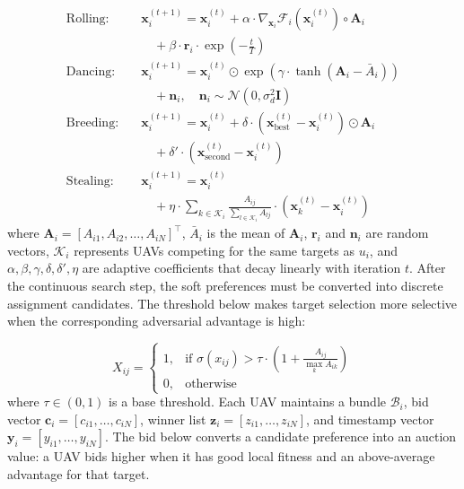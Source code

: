 \documentclass[lettersize,journal]{IEEEtran}
\begin{document}
\begin{align}
\text{Rolling:} \quad & \mathbf{x}_i^{(t+1)} = \mathbf{x}_i^{(t)} + \alpha \cdot \nabla_{\mathbf{x}_i} \mathcal{F}_i(\mathbf{x}_i^{(t)}) \circ \mathbf{A}_i \nonumber \\
& \quad + \beta \cdot \mathbf{r}_i \cdot \exp\left(-\frac{t}{T}\right) \label{eq:rolling_update} \\
\text{Dancing:} \quad & \mathbf{x}_i^{(t+1)} = \mathbf{x}_i^{(t)} \odot \exp\left(\gamma \cdot \tanh(\mathbf{A}_i - \bar{A}_i)\right) \nonumber \\
& \quad + \mathbf{n}_i, \quad \mathbf{n}_i \sim \mathcal{N}(0, \sigma_d^2 \mathbf{I}) \label{eq:dancing_update} \\
\text{Breeding:} \quad & \mathbf{x}_i^{(t+1)} = \mathbf{x}_i^{(t)} + \delta \cdot \left(\mathbf{x}_{\text{best}}^{(t)} - \mathbf{x}_i^{(t)}\right) \odot \mathbf{A}_i \nonumber \\
& \quad + \delta' \cdot \left(\mathbf{x}_{\text{second}}^{(t)} - \mathbf{x}_i^{(t)}\right) \label{eq:breeding_update} \\
\text{Stealing:} \quad & \mathbf{x}_i^{(t+1)} = \mathbf{x}_i^{(t)} \nonumber \\
& \quad + \eta \cdot \sum_{k \in \mathcal{K}_i} \frac{A_{ij}}{\sum_{l \in \mathcal{K}_i} A_{lj}} \cdot \left(\mathbf{x}_k^{(t)} - \mathbf{x}_i^{(t)}\right) \label{eq:stealing_update}
\end{align}
where $\mathbf{A}_i = [A_{i1}, A_{i2}, \dots, A_{iN}]^\top$, $\bar{A}_i$ is the mean of $\mathbf{A}_i$, $\mathbf{r}_i$ and $\mathbf{n}_i$ are random vectors, $\mathcal{K}_i$ represents UAVs competing for the same targets as $u_i$, and $\alpha, \beta, \gamma, \delta, \delta', \eta$ are adaptive coefficients that decay linearly with iteration $t$. After the continuous search step, the soft preferences must be converted into discrete assignment candidates. The threshold below makes target selection more selective when the corresponding adversarial advantage is high:

\begin{equation}
\label{eq:thresholding}
X_{ij} = 
\begin{cases}
1, & \text{if } \sigma(x_{ij}) > \tau \cdot \left(1 + \frac{A_{ij}}{\max_k A_{ik}}\right) \\
0, & \text{otherwise}
\end{cases}
\end{equation}
where $\tau \in (0,1)$ is a base threshold. Each UAV maintains a bundle $\mathcal{B}_i$, bid vector $\mathbf{c}_i = [c_{i1}, \dots, c_{iN}]$, winner list $\mathbf{z}_i = [z_{i1}, \dots, z_{iN}]$, and timestamp vector $\mathbf{y}_i = [y_{i1}, \dots, y_{iN}]$. The bid below converts a candidate preference into an auction value: a UAV bids higher when it has good local fitness and an above-average advantage for that target.
\end{document}
